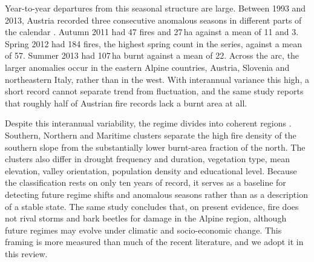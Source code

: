 \documentclass[11pt,a4paper]{article}
\begin{document}
Year-to-year departures from this seasonal structure are large. Between 1993 and 2013, Austria recorded three consecutive anomalous seasons in different parts of the calendar \citep{muller_anomalies_2015}. Autumn 2011 had 47 fires and 27\,ha against a mean of 11 and 3. Spring 2012 had 184 fires, the highest spring count in the series, against a mean of 57. Summer 2013 had 107\,ha burnt against a mean of 22. Across the arc, the larger anomalies occur in the eastern Alpine countries, Austria, Slovenia and northeastern Italy, rather than in the west. With interannual variance this high, a short record cannot separate trend from fluctuation, and the same study reports that roughly half of Austrian fire records lack a burnt area at all.

Despite this interannual variability, the regime divides into coherent regions \citep{conedera_characterizing_2018}. Southern, Northern and Maritime clusters separate the high fire density of the southern slope from the substantially lower burnt-area fraction of the north. The clusters also differ in drought frequency and duration, vegetation type, mean elevation, valley orientation, population density and educational level. Because the classification rests on only ten years of record, it serves as a baseline for detecting future regime shifts and anomalous seasons rather than as a description of a stable state. The same study concludes that, on present evidence, fire does not rival storms and bark beetles for damage in the Alpine region, although future regimes may evolve under climatic and socio-economic change. This framing is more measured than much of the recent literature, and we adopt it in this review.
\end{document}

